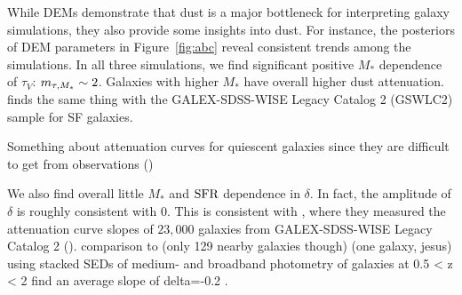 
While DEMs demonstrate that dust is a major bottleneck for interpreting galaxy
simulations, they also provide some insights into dust. For instance, the
posteriors of DEM parameters in Figure~\ref{fig:abc} reveal consistent trends
among the simulations. In all three simulations, we find significant positive
$M_*$ dependence of $\tau_V$: $m_{\tau,M_*} \sim 2$. Galaxies with higher $M_*$ have
overall higher dust attenuation. 
\cite{salim2018} finds the same thing with the GALEX-SDSS-WISE Legacy Catalog 2
(GSWLC2) sample for SF galaxies. 


Something about attenuation curves for quiescent galaxies since they are
difficult to get from observations ()

We also find overall little $M_*$ and ${\rm SFR}$ dependence in $\delta$. In
fact, the amplitude of $\delta$ is roughly consistent with 0.  
This is consistent with \cite{salim2020}, where they measured the attenuation
curve slopes of $23,000$ galaxies from GALEX-SDSS-WISE Legacy Catalog 2
(). 
comparison to \cite{leja2017} (only 129 nearby galaxies though) 
\cite{viaene2017} (one galaxy, jesus)  
\cite{kriek2013}  using stacked SEDs of medium- and broadband photometry of
galaxies at 0.5 < z < 2 find an average slope of delta=-0.2 . %


